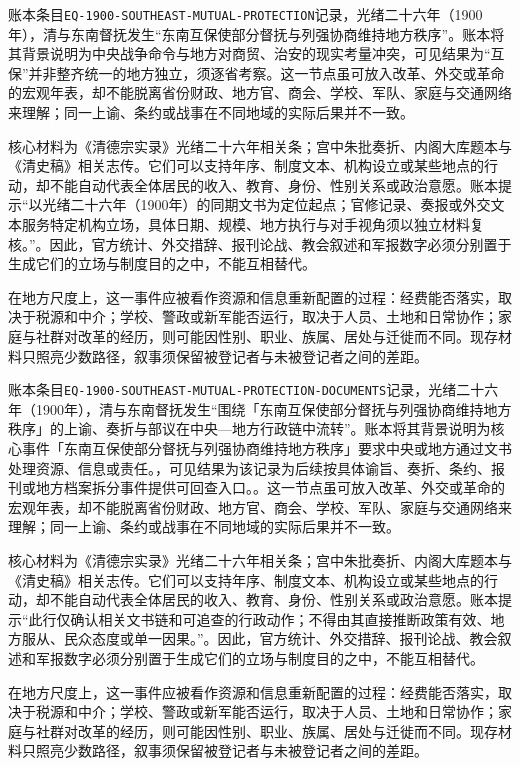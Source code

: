 账本条目\texttt{EQ-1900-SOUTHEAST-MUTUAL-PROTECTION}记录，光绪二十六年（1900年），清与东南督抚发生“东南互保使部分督抚与列强协商维持地方秩序”。账本将其背景说明为中央战争命令与地方对商贸、治安的现实考量冲突，可见结果为“互保”并非整齐统一的地方独立，须逐省考察。这一节点虽可放入改革、外交或革命的宏观年表，却不能脱离省份财政、地方官、商会、学校、军队、家庭与交通网络来理解；同一上谕、条约或战事在不同地域的实际后果并不一致。

核心材料为《清德宗实录》光绪二十六年相关条；宫中朱批奏折、内阁大库题本与《清史稿》相关志传。它们可以支持年序、制度文本、机构设立或某些地点的行动，却不能自动代表全体居民的收入、教育、身份、性别关系或政治意愿。账本提示“以光绪二十六年（1900年）的同期文书为定位起点；官修记录、奏报或外交文本服务特定机构立场，具体日期、规模、地方执行与对手视角须以独立材料复核。”。因此，官方统计、外交措辞、报刊论战、教会叙述和军报数字必须分别置于生成它们的立场与制度目的之中，不能互相替代。

在地方尺度上，这一事件应被看作资源和信息重新配置的过程：经费能否落实，取决于税源和中介；学校、警政或新军能否运行，取决于人员、土地和日常协作；家庭与社群对改革的经历，则可能因性别、职业、族属、居处与迁徙而不同。现存材料只照亮少数路径，叙事须保留被登记者与未被登记者之间的差距。

账本条目\texttt{EQ-1900-SOUTHEAST-MUTUAL-PROTECTION-DOCUMENTS}记录，光绪二十六年（1900年），清与东南督抚发生“围绕「东南互保使部分督抚与列强协商维持地方秩序」的上谕、奏折与部议在中央—地方行政链中流转”。账本将其背景说明为核心事件「东南互保使部分督抚与列强协商维持地方秩序」要求中央或地方通过文书处理资源、信息或责任。，可见结果为该记录为后续按具体谕旨、奏折、条约、报刊或地方档案拆分事件提供可回查入口。。这一节点虽可放入改革、外交或革命的宏观年表，却不能脱离省份财政、地方官、商会、学校、军队、家庭与交通网络来理解；同一上谕、条约或战事在不同地域的实际后果并不一致。

核心材料为《清德宗实录》光绪二十六年相关条；宫中朱批奏折、内阁大库题本与《清史稿》相关志传。它们可以支持年序、制度文本、机构设立或某些地点的行动，却不能自动代表全体居民的收入、教育、身份、性别关系或政治意愿。账本提示“此行仅确认相关文书链和可追查的行政动作；不得由其直接推断政策有效、地方服从、民众态度或单一因果。”。因此，官方统计、外交措辞、报刊论战、教会叙述和军报数字必须分别置于生成它们的立场与制度目的之中，不能互相替代。

在地方尺度上，这一事件应被看作资源和信息重新配置的过程：经费能否落实，取决于税源和中介；学校、警政或新军能否运行，取决于人员、土地和日常协作；家庭与社群对改革的经历，则可能因性别、职业、族属、居处与迁徙而不同。现存材料只照亮少数路径，叙事须保留被登记者与未被登记者之间的差距。

